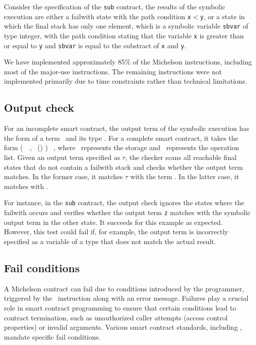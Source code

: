 \documentclass[runningheads]{llncs}
\begin{document}
Consider the specification of the \lstinline/sub/ contract, the results of
the symbolic execution are either a failwith state with the path
condition \lstinline/x/$<$\lstinline/y/,  or a state in which the
final stack has only one element, which is a symbolic variable
\lstinline/sbvar/ of type integer, with the path condition stating
that the variable \lstinline/x/ is greater than or equal to
\lstinline/y/ and  \lstinline/sbvar/ is equal to
the substract of \lstinline/x/ and \lstinline/y/. 

We have implemented approximately 85\% of the Michelson instructions, including most of the major-use instructions. The remaining instructions were not implemented primarily due to time constraints rather than technical limitations.

\subsection{Output check}
\label{sec:output-check}
For an incomplete smart contract, the output term of the symbolic execution has the form of a term \Term\ and its type \TY. For a complete smart contract, it takes the form (\PAIR\ \VOPERATIONLIST\ \VSTORAGE, \TPAIR\ (\TOPERATIONLIST) \TYS) \STACKCONCAT\ \EMPTYSTACK, where \VSTORAGE\ represents the storage and \VOPERATIONLIST\ represents the operation list. Given an output term specified as $\tau$, the checker scans all reachable final states that do not contain a failwith stack and checks whether the output term matches. In the former case, it matches $\tau$ with the term \Term. In the latter case, it matches with \VSTORAGE. 

For instance, in the \lstinline|sub| contract, the output check ignores the states where the failwith occurs and verifies whether the output term \lstinline|z| matches with the symbolic output term in the other state. It succeeds for this example as expected. However, this test could fail if, for example, the output term is incorrectly specified as a variable of a type that does not match the actual result.

\subsection{Fail conditions}
\label{sec:fail-conditions}
A Michelson contract can fail due to conditions introduced by the programmer, triggered by the \FAILWITH\ instruction along with an error message. Failures play a crucial role in smart contract programming to ensure that certain conditions lead to contract termination, such as unauthorized caller attempts (access control properties) or invalid arguments. Various smart contract standards, including \cite{erc, fa}, mandate specific fail conditions.
\end{document}
